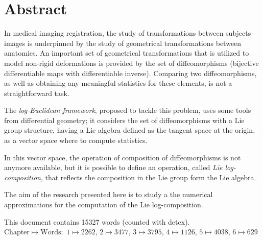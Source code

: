 
\qquad
\pagestyle{empty}
\newpage



\section*{Abstract}


In medical imaging registration, the study of transformations between subjects images is underpinned by the study of geometrical transformations between anatomies. An important set of geometrical transformations that is utilized to model non-rigid deformations is provided by the set of diffeomorphisms (bijective differentiable maps with differentiable inverse).
Comparing two diffeomorphisms, as well as obtaining any meaningful statistics for these elements, is not a straightforward task.

The \emph{log-Euclidean framework}, proposed to tackle this problem, uses some tools from differential geometry; it considers the set of diffeomorphisms with a Lie group structure, having a Lie algebra defined as the tangent space at the origin, as a vector space where to compute statistics.

In this vector space, the operation of composition of diffeomorphisms is not anymore available, but it is possible to define an operation, called \emph{Lie log-composition}, that reflects the composition in the Lie group form the Lie algebra.

The aim of the research presented here is to study a the numerical approximations for the computation of the Lie log-composition. 


\vspace{1cm}

\noindent
This document contains 15327 words (counted with detex).\\
$ \text{Chapter} \mapsto \text{Words}:$ 
$1 \mapsto 2262$,
$2 \mapsto 3477 $,
$3 \mapsto 3795 $,
$4 \mapsto 1126 $,
$5 \mapsto 4038$,
$6 \mapsto 629$

\qquad
\pagestyle{empty}
\newpage


